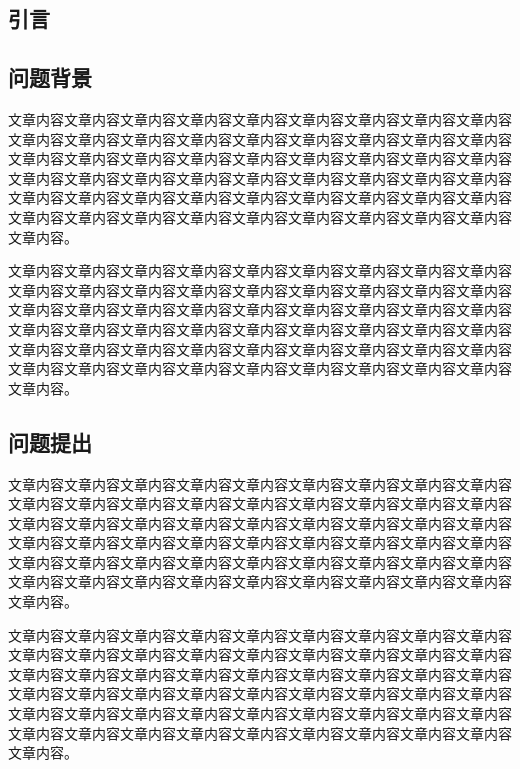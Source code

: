 \begin{center}\item\section{引言}\end{center}

\subsection{问题背景}

文章内容文章内容文章内容文章内容文章内容文章内容文章内容文章内容文章内容文章内容文章内容文章内容文章内容文章内容文章内容文章内容文章内容文章内容文章内容文章内容文章内容文章内容文章内容文章内容文章内容文章内容文章内容文章内容文章内容文章内容文章内容文章内容文章内容文章内容文章内容文章内容文章内容文章内容文章内容文章内容文章内容文章内容文章内容文章内容文章内容文章内容文章内容文章内容文章内容文章内容文章内容文章内容文章内容文章内容文章内容。

文章内容文章内容文章内容文章内容文章内容文章内容文章内容文章内容文章内容文章内容文章内容文章内容文章内容文章内容文章内容文章内容文章内容文章内容文章内容文章内容文章内容文章内容文章内容文章内容文章内容文章内容文章内容文章内容文章内容文章内容文章内容文章内容文章内容文章内容文章内容文章内容文章内容文章内容文章内容文章内容文章内容文章内容文章内容文章内容文章内容文章内容文章内容文章内容文章内容文章内容文章内容文章内容文章内容文章内容文章内容。



\subsection{问题提出}

文章内容文章内容文章内容文章内容文章内容文章内容文章内容文章内容文章内容文章内容文章内容文章内容文章内容文章内容文章内容文章内容文章内容文章内容文章内容文章内容文章内容文章内容文章内容文章内容文章内容文章内容文章内容文章内容文章内容文章内容文章内容文章内容文章内容文章内容文章内容文章内容文章内容文章内容文章内容文章内容文章内容文章内容文章内容文章内容文章内容文章内容文章内容文章内容文章内容文章内容文章内容文章内容文章内容文章内容文章内容。

文章内容文章内容文章内容文章内容文章内容文章内容文章内容文章内容文章内容文章内容文章内容文章内容文章内容文章内容文章内容文章内容文章内容文章内容文章内容文章内容文章内容文章内容文章内容文章内容文章内容文章内容文章内容文章内容文章内容文章内容文章内容文章内容文章内容文章内容文章内容文章内容文章内容文章内容文章内容文章内容文章内容文章内容文章内容文章内容文章内容文章内容文章内容文章内容文章内容文章内容文章内容文章内容文章内容文章内容文章内容。

